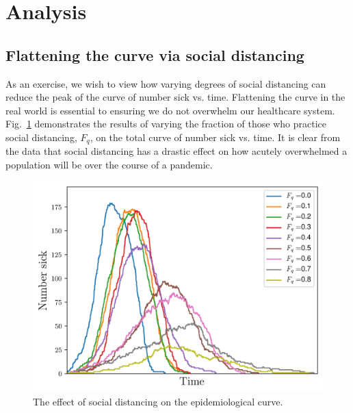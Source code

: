 \documentclass[11pt]{article}
\begin{document}
\section{Analysis}
\subsection{Flattening the curve via social distancing}
As an exercise, we wish to view how varying degrees of social distancing can reduce the peak of the curve of number sick vs. time. Flattening the curve in the real world is essential to ensuring we do not overwhelm our healthcare system. Fig.~\ref{fig:flatten} demonstrates the results of varying the fraction of those who practice social distancing, $F_q$, on the total curve of number sick vs. time. It is clear from the data that social distancing has a drastic effect on how acutely overwhelmed a population will be over the course of a pandemic.
\begin{figure}[h]
    \centering
    \includegraphics[scale=.6]{figs/flatten.png}
    \caption{The effect of social distancing on the epidemiological curve.}\label{fig:flatten}
\end{figure}
\end{document}
